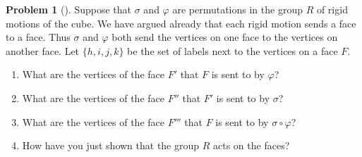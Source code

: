 \documentclass[10pt,]{book}
\theoremstyle{plain}
\theoremstyle{definition}
\newtheorem{activity}[project]{Problem}
\theoremstyle{definition}
\numberwithin{equation}{chapter}
\begin{document}
\begin{activity}[] \label{activity-283}
Suppose that \(\sigma\) and \(\varphi\) are permutations in the group \(R\) of rigid motions of the cube. We have argued already that each rigid motion sends a face to a face. Thus \(\sigma\) and \(\varphi\) both send the vertices on one face to the vertices on another face. Let \(\{h,i,j,k\}\) be the set of labels next to the vertices on a face \(F\).%
\begin{enumerate}[font=\bfseries,label=(\alph*),ref=\alph*]
\item\label{task-208} \marginsymbol[-2.5em]{} What are the vertices of the face \(F'\) that \(F\) is sent to by \(\varphi\)?%
\item\label{task-209} \marginsymbol[-2.5em]{} What are the vertices of the face \(F''\) that \(F'\) is sent to by \(\sigma\)?%
\item\label{task-210} \marginsymbol[-2.5em]{} What are the vertices of the face \(F'''\) that \(F\) is sent to by \(\sigma\circ\varphi\)?%
\item\label{task-211} \marginsymbol[-2.5em]{} How have you just shown that the group \(R\) acts on the faces?%
\end{enumerate}
\end{activity}
\typeout{************************************************}
\typeout{************************************************}
\end{document}
